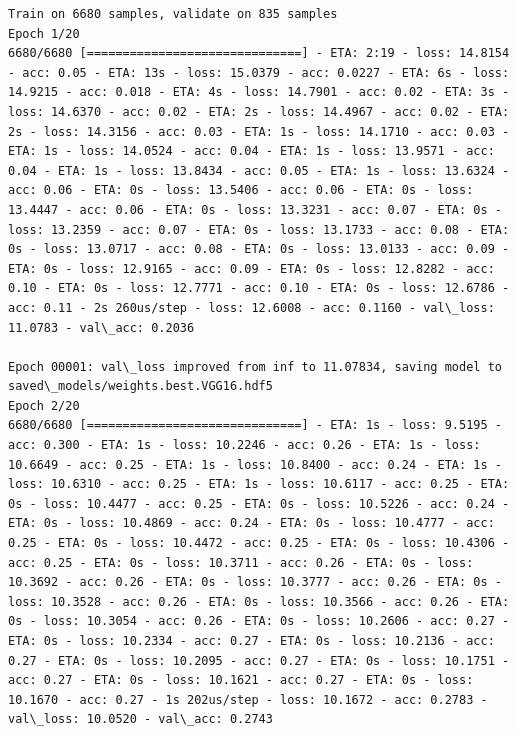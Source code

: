 \documentclass[11pt]{article}
\begin{document}
    \begin{Verbatim}[commandchars=\\\{\}]
Train on 6680 samples, validate on 835 samples
Epoch 1/20
6680/6680 [==============================] - ETA: 2:19 - loss: 14.8154 - acc: 0.05 - ETA: 13s - loss: 15.0379 - acc: 0.0227 - ETA: 6s - loss: 14.9215 - acc: 0.018 - ETA: 4s - loss: 14.7901 - acc: 0.02 - ETA: 3s - loss: 14.6370 - acc: 0.02 - ETA: 2s - loss: 14.4967 - acc: 0.02 - ETA: 2s - loss: 14.3156 - acc: 0.03 - ETA: 1s - loss: 14.1710 - acc: 0.03 - ETA: 1s - loss: 14.0524 - acc: 0.04 - ETA: 1s - loss: 13.9571 - acc: 0.04 - ETA: 1s - loss: 13.8434 - acc: 0.05 - ETA: 1s - loss: 13.6324 - acc: 0.06 - ETA: 0s - loss: 13.5406 - acc: 0.06 - ETA: 0s - loss: 13.4447 - acc: 0.06 - ETA: 0s - loss: 13.3231 - acc: 0.07 - ETA: 0s - loss: 13.2359 - acc: 0.07 - ETA: 0s - loss: 13.1733 - acc: 0.08 - ETA: 0s - loss: 13.0717 - acc: 0.08 - ETA: 0s - loss: 13.0133 - acc: 0.09 - ETA: 0s - loss: 12.9165 - acc: 0.09 - ETA: 0s - loss: 12.8282 - acc: 0.10 - ETA: 0s - loss: 12.7771 - acc: 0.10 - ETA: 0s - loss: 12.6786 - acc: 0.11 - 2s 260us/step - loss: 12.6008 - acc: 0.1160 - val\_loss: 11.0783 - val\_acc: 0.2036

Epoch 00001: val\_loss improved from inf to 11.07834, saving model to saved\_models/weights.best.VGG16.hdf5
Epoch 2/20
6680/6680 [==============================] - ETA: 1s - loss: 9.5195 - acc: 0.300 - ETA: 1s - loss: 10.2246 - acc: 0.26 - ETA: 1s - loss: 10.6649 - acc: 0.25 - ETA: 1s - loss: 10.8400 - acc: 0.24 - ETA: 1s - loss: 10.6310 - acc: 0.25 - ETA: 1s - loss: 10.6117 - acc: 0.25 - ETA: 0s - loss: 10.4477 - acc: 0.25 - ETA: 0s - loss: 10.5226 - acc: 0.24 - ETA: 0s - loss: 10.4869 - acc: 0.24 - ETA: 0s - loss: 10.4777 - acc: 0.25 - ETA: 0s - loss: 10.4472 - acc: 0.25 - ETA: 0s - loss: 10.4306 - acc: 0.25 - ETA: 0s - loss: 10.3711 - acc: 0.26 - ETA: 0s - loss: 10.3692 - acc: 0.26 - ETA: 0s - loss: 10.3777 - acc: 0.26 - ETA: 0s - loss: 10.3528 - acc: 0.26 - ETA: 0s - loss: 10.3566 - acc: 0.26 - ETA: 0s - loss: 10.3054 - acc: 0.26 - ETA: 0s - loss: 10.2606 - acc: 0.27 - ETA: 0s - loss: 10.2334 - acc: 0.27 - ETA: 0s - loss: 10.2136 - acc: 0.27 - ETA: 0s - loss: 10.2095 - acc: 0.27 - ETA: 0s - loss: 10.1751 - acc: 0.27 - ETA: 0s - loss: 10.1621 - acc: 0.27 - ETA: 0s - loss: 10.1670 - acc: 0.27 - 1s 202us/step - loss: 10.1672 - acc: 0.2783 - val\_loss: 10.0520 - val\_acc: 0.2743


\end{Verbatim}
\end{document}
